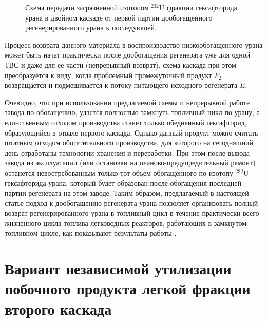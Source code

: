 \begin{figure}[ht]
  \caption{Схема передачи загрязненной изотопом $^{232}$U фракции гексафторида урана в двойном каскаде от первой партии дообогащенного регенерированного урана к последующей.}\label{P2utilizationRing}
\end{figure}

Процесс возврата данного материала в воспроизводство низкообогащенного урана может быть начат практически после дообогащения регенерата уже для одной ТВС и даже для ее части (непрерывный возврат), схема каскада при этом преобразуется к виду, когда проблемный промежуточный продукт $P_2$ возвращается и подмешивается к потоку питающего исходного регенерата $E$.

Очевидно, что при использовании предлагаемой схемы и непрерывной работе завода по обогащению, удастся полностью замкнуть топливный цикл по урану, а единственным отходом производства станет только обедненный гексафторид, образующийся в отвале первого каскада. Однако данный продукт можно считать штатным отходом
обогатительного производства, для которого на сегодняшний день отработаны технологии хранения и переработки. При этом после вывода завода из эксплуатации (или остановки на планово-предупредительный ремонт) останется невостребованным только тот объем обогащенного по изотопу $^{232}$U гексафторида урана, который будет образован после обогащения последней партии регенерата на этом заводе. Таким образом, предлагаемый в настоящей статье подход к дообогащению регенерата урана позволяет организовать полный возврат регенерированного урана в топливный цикл в течение практически всего жизненного цикла топлива легководных реакторов,
работающих в замкнутом топливном цикле, как показывают результаты работы \cite{nevinicaToplivnyyCiklLegkovodnogo2019}.

\section{Вариант независимой утилизации побочного продукта легкой фракции второго каскада}


